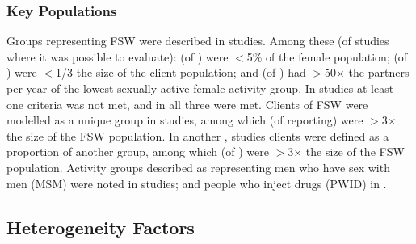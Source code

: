 \subsubsection{Key Populations}
\label{sss:res:kp}
Groups representing FSW were described in  studies.
Among these (of studies where it was possible to evaluate):
 (of ) were {$<$5\%} of the female population;
 (of ) were {$<$1/3} the size of the client population; and
 (of ) had {$>$50$\times$} the partners per year of
the lowest sexually active female activity group.
In  studies at least one criteria was not met, and
in  all three were met.
Clients of FSW were modelled as a unique group in  studies,
among which  (of  reporting)
were {$>$3$\times$} the size of the FSW population.
In another , studies clients were defined as a proportion of another group,
among which  (of )
were {$>$3$\times$} the size of the FSW population.
Activity groups described as representing
men who have sex with men (MSM) were noted in  studies; and
people who inject drugs (PWID) in .
\subsection{Heterogeneity Factors}
\label{ss:res:factors}
